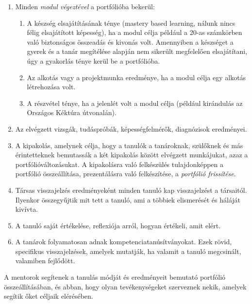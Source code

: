 \begin{enumerate}
\item Minden \emph{modul végeztével} a portfólióba bekerül:

\begin{enumerate}

\item  A készség elsajátításának ténye (mastery based learning, nálunk nincs félig elsajátított képesség), ha a modul célja például a 20-as számkörben való biztonságos összeadás és kivonás volt. Amennyiben a készséget a gyerek és a tanár megítélése alapján nem sikerült megfelelően elsajátítani, úgy a gyakorlás ténye kerül be a portfólióba.

\item Az alkotás vagy a projektmunka eredménye, ha a modul célja egy alkotás létrehozása volt.

\item A részvétel ténye, ha a jelenlét volt a modul célja (például kirándulás az Országos Kéktúra útvonalán).


\end{enumerate}
\item Az elvégzett vizsgák, tudáspróbák, képességfelmérők, diagnózisok eredményei.

\item A kipakolás, amelynek célja, hogy a tanulók a tanároknak, szülőknek és más érintetteknek bemutassák a két kipakolás között elvégzett munkájukat, azaz a portfólióváltozásukat. A kipakolásra való felkészülés tulajdonképpen a portfólió összeállítása, prezentálásra való felkészítése, a \emph{portfólió frissítése}.

\item Társas visszajelzés eredményeként minden tanuló kap visszajelzést a társaitól. Ilyenkor összegyűjtik mit tett a tanuló, ami a többiek elismerését és háláját kivívta.

\item A tanuló saját értékelése, reflexiója arról, hogyan értékeli, amit elért.

\item A tanárok folyamatosan adnak kompetenciatanúsítványokat. Ezek rövid, specifikus visszajelzések, amelyek mutatják, ha valamit a tanuló megcsinált, valamiben fejlődött.
\end{enumerate}

A mentorok segítenek a tanulás módját és eredményeit bemutató portfólió összeállításában, és abban, hogy olyan tevékenységeket szerveznek nekik, amelyek segítik őket céljaik elérésében.
